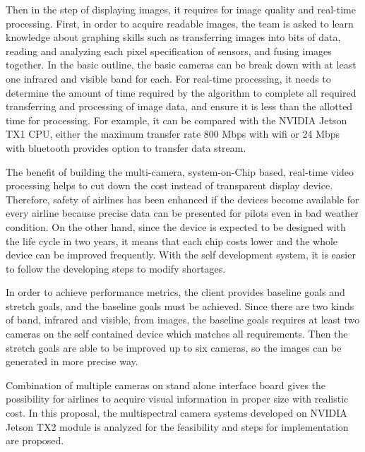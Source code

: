 \documentclass[onecolumn, draftclsnofoot,10pt, compsoc]{IEEEtran}
\begin{document}
Then in the step of displaying images, it requires for image quality and real-time processing. First, in order to acquire readable images, the team is asked to learn knowledge about graphing skills such as transferring images into bits of data, reading and analyzing each pixel specification of sensors, and fusing images together. In the basic outline, the basic cameras can be break down with at least one infrared and visible band for each. For real-time processing, it needs to determine the amount of time required by the algorithm to complete all required transferring and processing of image data, and ensure it is less than the allotted time for processing. For example, it can be compared with the NVIDIA Jetson TX1 CPU, either the maximum transfer rate 800 Mbps with wifi or 24 Mbps with bluetooth provides option to transfer data stream.

The benefit of building the multi-camera, system-on-Chip based, real-time video processing helps to cut down the cost instead of transparent display device. Therefore, safety of airlines has been enhanced if the devices become available for every airline because precise data can be presented for pilots even in bad weather condition. On the other hand, since the device is expected to be designed with the life cycle in two years, it means that each chip costs lower and the whole device can be improved frequently. With the self development system, it is easier to follow the developing steps to modify shortages.

In order to achieve performance metrics, the client provides baseline goals and stretch goals, and the baseline goals must be achieved. Since there are two kinds of band, infrared and visible, from images, the baseline goals requires at least two cameras on the self contained device which matches all requirements. Then the stretch goals are able to be improved up to six cameras, so the images can be generated in more precise way.

Combination of multiple cameras on stand alone interface board gives the possibility for airlines to acquire visual information in proper size with realistic cost. In this proposal, the multispectral camera systems developed on NVIDIA Jetson TX2 module is analyzed for the feasibility and steps for implementation are proposed.
\end{document}
